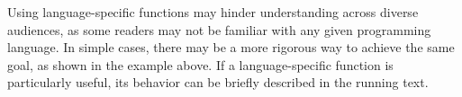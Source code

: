 


\noindent Using language-specific functions may hinder understanding across diverse audiences, as some readers may not be familiar with any given programming language.
In simple cases, there may be a more rigorous way to achieve the same goal, as shown in the example above.
If a language-specific function is particularly useful, its behavior can be briefly described in the running text.
